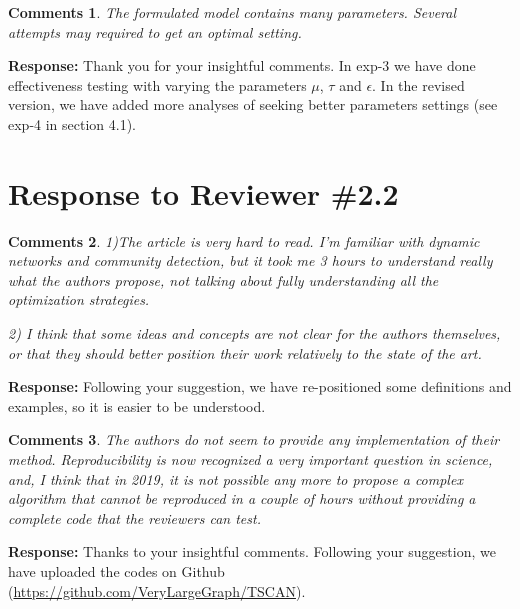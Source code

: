 \documentclass{article}
\newtheorem{Comments}{\textbf{Comments}}
\begin{document}
	
\begin{Comments}
The formulated model contains many parameters. Several attempts may required to get an optimal setting. 
\end{Comments}
\noindent \textbf{Response: } Thank you for your insightful comments. In exp-3 we have done effectiveness testing with varying the parameters $\mu$, $\tau$ and $\epsilon$. In the revised version, we have added more analyses of seeking better parameters settings (see exp-4 in section 4.1).



\section{Response to Reviewer \#2.2}
\setcounter{Comments}{0}
\begin{Comments}
1)The article is very hard to read. I’m familiar with dynamic networks and community detection, but it took me 3 hours to understand really what the authors propose, not talking about fully understanding all the optimization strategies.

2) I think that some ideas and concepts are not clear for the authors themselves, or that they should better position their work relatively to the state of the art.

\end{Comments}
\noindent \textbf{Response: } Following your suggestion, we have re-positioned some definitions and examples, so it is easier to be understood.


\begin{Comments}
	The authors do not seem to provide any implementation of their method. Reproducibility is now recognized a very important question in science, and, I think that in 2019, it is not possible any more to propose a complex algorithm that cannot be reproduced in a couple of hours without providing a complete code that the reviewers can test.
\end{Comments}
\noindent \textbf{Response: } Thanks to your insightful comments. Following your suggestion, we have uploaded the codes on Github (\url{https://github.com/VeryLargeGraph/TSCAN}).
\end{document}

